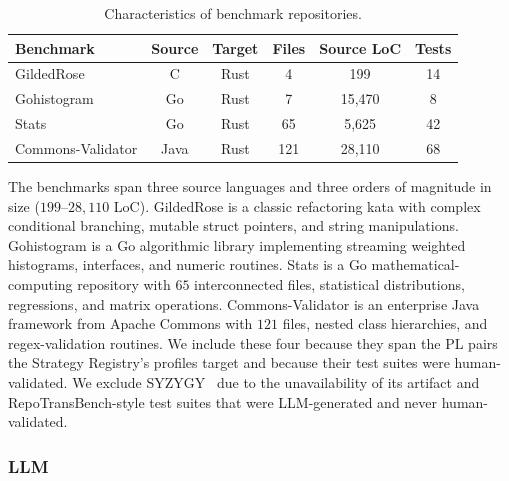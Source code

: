 \begin{table}[!t]
\centering
\small
\begin{tabular}{lccccc}
\toprule
\textbf{Benchmark} & \textbf{Source} & \textbf{Target} & \textbf{Files} & \textbf{Source LoC} & \textbf{Tests} \\
\midrule
GildedRose & C & Rust & 4 & 199 & 14 \\
Gohistogram & Go & Rust & 7 & 15{,}470 & 8 \\
Stats & Go & Rust & 65 & 5{,}625 & 42 \\
Commons-Validator & Java & Rust & 121 & 28{,}110 & 68 \\
\bottomrule
\end{tabular}
\vspace{0.3em}
\caption{Characteristics of benchmark repositories.}
\label{tab:benchmarks}
\end{table}

The benchmarks span three source languages and three orders of magnitude
in size ($199$--$28{,}110$ LoC). GildedRose is a classic refactoring
kata with complex conditional branching, mutable struct pointers, and
string manipulations. Gohistogram is a Go algorithmic library
implementing streaming weighted histograms, interfaces, and numeric
routines. Stats is a Go mathematical-computing repository with
$65$ interconnected files, statistical distributions, regressions, and
matrix operations. Commons-Validator is an enterprise Java framework
from Apache Commons with $121$ files, nested class hierarchies, and
regex-validation routines. We include these four because they span the
PL pairs the Strategy Registry's profiles target and because their
test suites were human-validated. We exclude SYZYGY~\cite{p58_syzygy}
due to the unavailability of its artifact and RepoTransBench-style
test suites that were LLM-generated and never human-validated.

\subsubsection{LLM}
\label{sec:eval_llm}

